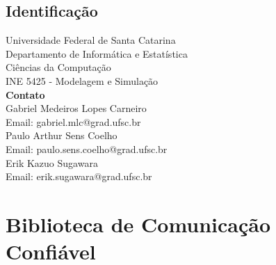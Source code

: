 \documentclass[
	12pt,				%
	openright,			%
	oneside,			%
	a4paper,			%
	english,			%
	french,				%
	spanish,			%
	brazil				%
	]{abntex2}
\begin{document}





\tableofcontents*
\cleardoublepage



\textual

\chapter*[Introdução]{Identificação}

\begin{center}
	Universidade Federal de Santa Catarina \\
	Departamento de Informática e Estatística\\
	Ciências da Computação \\
	INE 5425 - Modelagem e Simulação \\
	\vspace*{5cm}
	\textbf{Contato} \\
	\vspace*{1cm}
    Gabriel Medeiros Lopes Carneiro\\
	Email: gabriel.mlc@grad.ufsc.br\\
	\vspace*{0.5cm}
    Paulo Arthur Sens Coelho\\
	Email: paulo.sens.coelho@grad.ufsc.br\\
	\vspace*{0.5cm}
	Erik Kazuo Sugawara \\
	Email: erik.sugawara@grad.ufsc.br \\
\end{center}
\part{Biblioteca de Comunicação Confiável}
\end{document}
